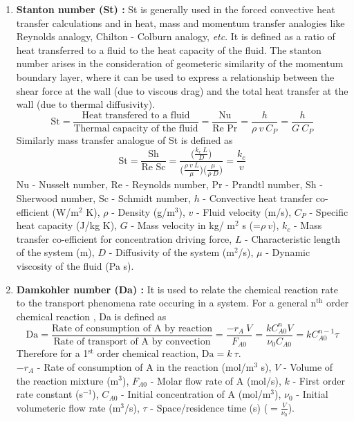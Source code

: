 \documentclass[a4paper, 12 pt]{article}
\begin{document}
\begin{enumerate}
    \item \textbf{Stanton number (St) :} St is generally used in the forced convective heat transfer calculations and in heat, mass and momentum transfer analogies like Reynolds analogy, Chilton - Colburn analogy, \textit{etc}. It is defined as a ratio of heat transferred to a fluid to the heat capacity of the fluid. The stanton number arises in the consideration of geometeric similarity of the momentum boundary layer, where it can be used to express a relationship between the shear force at the wall (due to viscous drag) and the total heat transfer at the wall (due to thermal diffusivity). $$\text{St}=\frac{\text{Heat transfered to a fluid}}{\text{Thermal capacity of the fluid}}=\frac{\text{Nu}}{\text{Re Pr}} = \frac{h}{\rho \ v\ C_P}=\frac{h}{G\ C_P}$$Similarly mass transfer analogue of St is defined as
    $$\text{St}=\frac{\text{Sh}}{\text{Re Sc}} = \frac{\big( \frac{k_c\ L}{D} \big)}{\big( \frac{\rho \ v\ L}{\mu} \big) \big( \frac{\mu}{\rho \ D}\big) }=\frac{k_c}{v}$$
    $\text{Nu}$ - Nusselt number, $\text{Re}$ - Reynolds number,
    $\text{Pr}$ - Prandtl number, $\text{Sh}$ - Sherwood number,
    $\text{Sc}$ - Schmidt number, $h$ - Convective heat transfer co-efficient (W/m$^2$ K), $\rho$ - Density  (g/m$^3$), $v$ - Fluid velocity (m/s), $C_P$ - Specific heat capacity (J/kg K), $G$ - Mass velocity in kg/ m$^2$ s (=$\rho \ v$), $k_c$ - Mass transfer co-efficient for concentration driving force, $L$ - Characteristic length of the system (m), $D$ - Diffusivity of the system (m$^2$/s), $\mu$ - Dynamic viscosity of the fluid (Pa s).
    
    
    \item \textbf{Damkohler number (Da) :} It is used to relate the chemical reaction rate to the transport phenomena rate occuring in a system. For a general n$^\text{th}$ order chemical reaction , Da is defined as $$\text{Da}=\frac{\text{Rate of consumption of A by reaction}}{\text{Rate of transport of A by convection}}=\frac{-r_A \ V}{F_{A0}}=\frac{kC_{A0}^nV}{\nu_0 C_{A0}}=kC_{A0}^{n-1}\tau$$Therefore for a 1$^{\text{st}}$ order chemical reaction, $\boxed{\text{Da} = k\ \tau}$.\\[2 mm]
    $-r_A$ - Rate of consumption of A in the reaction (mol/m$^3$ s),
    $V$ - Volume of the reaction  mixture (m$^3$),
    $F_{A0}$ - Molar flow rate of A (mol/s),
    $k$ - First order rate constant (s$^{-1}$),
    $C_{A0}$ - Initial concentration of A (mol/m$^3$),
    $\nu _{0}$ - Initial volumeteric flow rate (m$^3$/s),
    $\tau$ - Space/residence time (s) ($= \frac{V}{\nu _0}$).
    

\end{enumerate}
\end{document}

